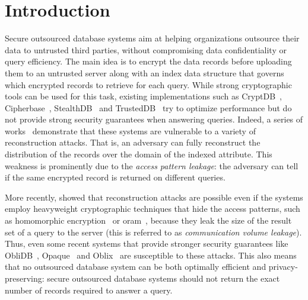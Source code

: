 \section{Introduction}

	Secure outsourced database systems aim at helping organizations outsource their data to untrusted third parties, without compromising data confidentiality or query efficiency.
	The main idea is to encrypt the data records before uploading them to an untrusted server along with an index data structure that governs which encrypted records to retrieve for each query.
	While strong cryptographic tools can be used for this task, existing implementations such as CryptDB~\cite{crypt-db}, Cipherbase~\cite{cipherbase}, StealthDB~\cite{stealth-db} and TrustedDB~\cite{trusted-db} try to optimize performance but do not provide strong security guarantees when answering queries.
	Indeed, a series of works~\cite{multidimensional-range-queries, inference-attack-islam-14, leakage-abuse-attacks-cash-15, inference-attacks-naveed-15, generic-attacks-kellaris, attacks-tao-of-inference, grubbs-attacks, access-pattern-disclosure, attacks-improved-reconstruction} demonstrate that these systems are vulnerable to a variety of reconstruction attacks.
	That is, an adversary can fully reconstruct the distribution of the records over the domain of the indexed attribute.
	This weakness is prominently due to the \emph{access pattern leakage}: the adversary can tell if the same encrypted record is returned on different queries.

	More recently, \cite{generic-attacks-kellaris, state-of-uniform, attacks-improved-reconstruction, pump-volume-attacks, volume-range-attacks} showed that reconstruction attacks are possible even if the systems employ heavyweight cryptographic techniques that hide the access patterns, such as homomorphic encryption~\cite{arbitrary-functions-encrypted, fully-homomorphic-encryption} or \acrfull{oram}~\cite{oram-theory, oram-original}, because they leak the size of the result set of a query to the server (this is referred to as \emph{communication volume leakage}). %
	Thus, even some recent systems that provide stronger security guarantees like ObliDB~\cite{oblidb}, Opaque~\cite{opaque} and Oblix~\cite{oblix} are susceptible to these attacks. %
	This also means that no outsourced database system can be both optimally efficient and privacy-preserving: secure outsourced database systems should not return the exact number of records required to answer a query.

